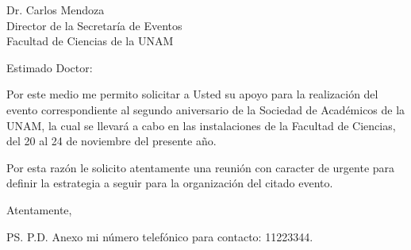 \documentclass[12pt]{letter}
\date{
	\today
}
\begin{document}
\begin{letter}{
	Dr. Carlos Mendoza\\
	Director de la Secretaría de Eventos \\
	Facultad de Ciencias de la UNAM
}

\opening{Estimado Doctor:}

Por este medio me permito solicitar a Usted su apoyo para la realización del evento 
correspondiente al segundo aniversario de la Sociedad de Académicos de la UNAM, 
la cual se llevará a cabo en las instalaciones de la Facultad de Ciencias, del 20
al 24 de noviembre del presente año.

Por esta razón le solicito atentamente una reunión con caracter de urgente para 
definir la estrategia a seguir para la organización del citado evento.

\closing{Atentamente,}


\ps{
	P.D. Anexo mi número telefónico para contacto: 11223344.
}	

\end{letter}
\end{document}
